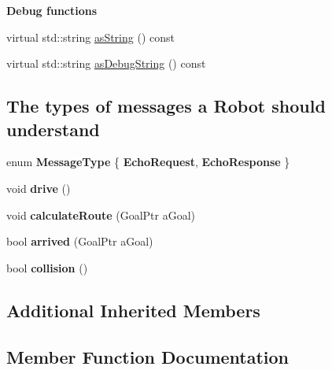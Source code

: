 \begin{Indent}{\bf Debug functions}\par
\begin{DoxyCompactItemize}
\item 
virtual std\+::string \hyperlink{class_model_1_1_robot_a888add69a87a3e0f82a3f9c95140716f}{as\+String} () const 
\item 
virtual std\+::string \hyperlink{class_model_1_1_robot_aaf05b81b0aff3dac7b39effa462da04e}{as\+Debug\+String} () const 
\end{DoxyCompactItemize}
\end{Indent}
\subsection*{The types of messages a Robot should understand}
\begin{DoxyCompactItemize}
\item 
enum {\bfseries Message\+Type} \{ {\bfseries Echo\+Request}, 
{\bfseries Echo\+Response}
 \}\hypertarget{class_model_1_1_robot_aa7cede8e43e597aea298266cc747b7c5}{}\label{class_model_1_1_robot_aa7cede8e43e597aea298266cc747b7c5}

\item 
void {\bfseries drive} ()\hypertarget{class_model_1_1_robot_a25462b6b270e44638522554646dd1180}{}\label{class_model_1_1_robot_a25462b6b270e44638522554646dd1180}

\item 
void {\bfseries calculate\+Route} (Goal\+Ptr a\+Goal)\hypertarget{class_model_1_1_robot_a398f0983a93029ebe3d52a9136e46035}{}\label{class_model_1_1_robot_a398f0983a93029ebe3d52a9136e46035}

\item 
bool {\bfseries arrived} (Goal\+Ptr a\+Goal)\hypertarget{class_model_1_1_robot_a2af2ed12ab1ba7fc165c65ab960ce47f}{}\label{class_model_1_1_robot_a2af2ed12ab1ba7fc165c65ab960ce47f}

\item 
bool {\bfseries collision} ()\hypertarget{class_model_1_1_robot_a64b560d02f2b8b2ce673ae79c48efee0}{}\label{class_model_1_1_robot_a64b560d02f2b8b2ce673ae79c48efee0}

\end{DoxyCompactItemize}
\subsection*{Additional Inherited Members}


\subsection{Member Function Documentation}
